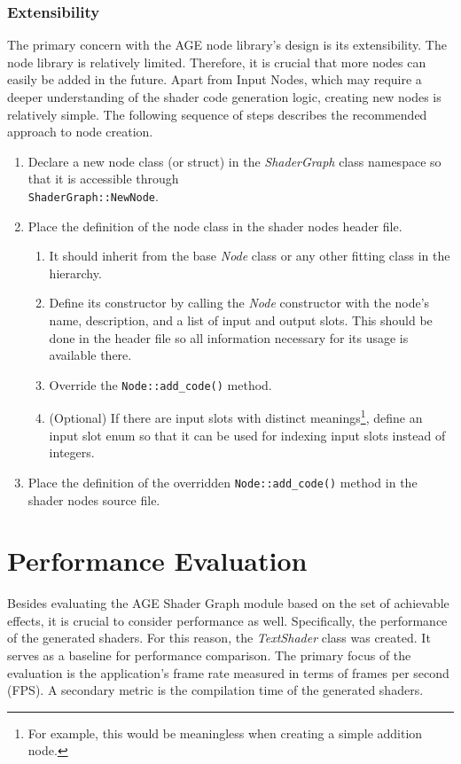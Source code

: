 \documentclass[
  digital,     %
  oneside,     %
  nosansbold,  %
  nocolorbold, %
  lof,         %
  lot,         %
]{fithesis4}
\begin{document}
\subsection{Extensibility}
The primary concern with the AGE node library's design is its extensibility.
The node library is relatively limited. Therefore, it is crucial that more nodes
can easily be added in the future. Apart from Input Nodes, which may require a deeper
understanding of the shader code generation logic, creating new nodes is relatively
simple. The following sequence of steps describes the recommended approach
to node creation.
\begin{enumerate}
    \item Declare a new node class (or struct) in the \textit{ShaderGraph} class namespace
    so that it is accessible through \\\verb|ShaderGraph::NewNode|.
    \item Place the definition of the node class in the shader nodes header file.
    \begin{enumerate}
        \item[2.1.] It should inherit from the base \textit{Node} class or any other
        fitting class in the hierarchy.
        \item[2.2.] Define its constructor by calling the \textit{Node} constructor
        with the node's name, description, and a list of input and output slots.
        This should be done in the header file so all information
        necessary for its usage is available there.
        \item[2.3.] Override the \verb|Node::add_code()| method.
        \item[2.4.] (Optional) If there are input slots
        with distinct meanings\footnote{For example, this would be meaningless
        when creating a simple addition node.}, define an input slot enum
        so that it can be used for indexing input slots instead of integers.
    \end{enumerate}
    \item Place the definition of the overridden \verb|Node::add_code()| method
    in the shader nodes source file.
\end{enumerate}

\chapter{Performance Evaluation}
Besides evaluating the AGE Shader Graph module based on the set of achievable effects,
it is crucial to consider performance as well. Specifically, the performance of the
generated shaders. For this reason, the \textit{TextShader} class was created.
It serves as a baseline for performance comparison. The primary focus of the evaluation
is the application's frame rate measured in terms of frames per second (FPS).
A secondary metric is the compilation time of the generated shaders.
\end{document}
